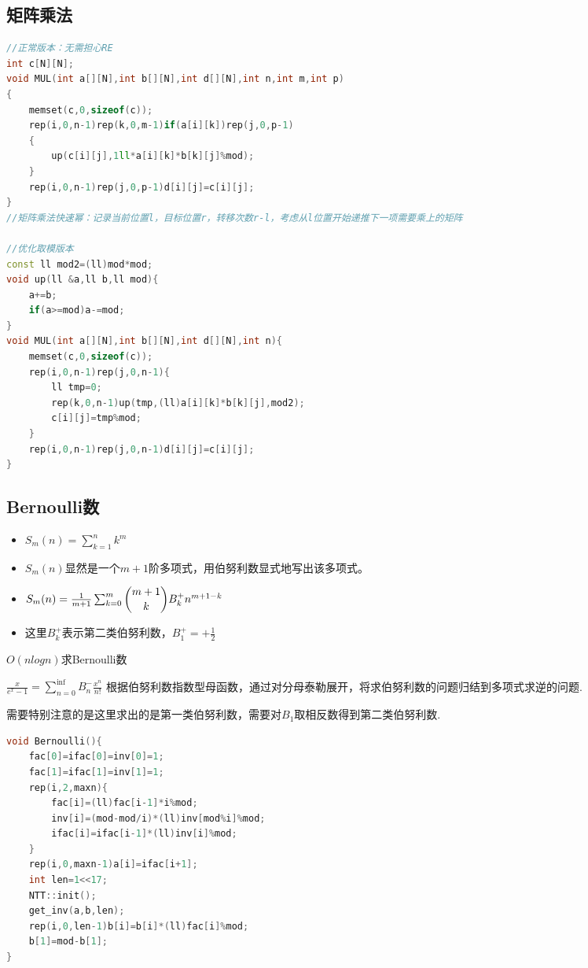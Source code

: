 \documentclass[UTF8,a4paper,titlepage]{ctexart}
\begin{document}
\subsection{矩阵乘法}
\begin{lstlisting}[language=C++]
//正常版本：无需担心RE
int c[N][N];
void MUL(int a[][N],int b[][N],int d[][N],int n,int m,int p)
{
	memset(c,0,sizeof(c));
	rep(i,0,n-1)rep(k,0,m-1)if(a[i][k])rep(j,0,p-1)
	{	
		up(c[i][j],1ll*a[i][k]*b[k][j]%mod);
	}
	rep(i,0,n-1)rep(j,0,p-1)d[i][j]=c[i][j];
}
//矩阵乘法快速幂：记录当前位置l，目标位置r，转移次数r-l，考虑从l位置开始递推下一项需要乘上的矩阵

//优化取模版本
const ll mod2=(ll)mod*mod;
void up(ll &a,ll b,ll mod){
	a+=b;
	if(a>=mod)a-=mod;
}
void MUL(int a[][N],int b[][N],int d[][N],int n){
	memset(c,0,sizeof(c));
	rep(i,0,n-1)rep(j,0,n-1){
		ll tmp=0;
		rep(k,0,n-1)up(tmp,(ll)a[i][k]*b[k][j],mod2);
		c[i][j]=tmp%mod;
	}
	rep(i,0,n-1)rep(j,0,n-1)d[i][j]=c[i][j];
}
\end{lstlisting}

\subsection{Bernoulli数}
\begin{itemize}
	\item $S_m(n)=\sum_{k=1}^{n}k^m$
	\item $S_m(n)$显然是一个$m+1$阶多项式，用伯努利数显式地写出该多项式。
	\item $S_m(n)= \frac{1}{m+1} \sum_{k=0}^{m} \dbinom{m+1}{k}B_{k}^{+}n^{m+1-k}$
	\item 这里$B_{k}^{+}$表示第二类伯努利数，$B_1^+=+\frac{1}{2}$
\end{itemize}

$O(nlogn)$求Bernoulli数

$\frac{x}{e^x-1}=\sum_{n=0}^{\inf}B_n^-\frac{x^n}{n!}$
根据伯努利数指数型母函数，通过对分母泰勒展开，将求伯努利数的问题归结到多项式求逆的问题.

需要特别注意的是这里求出的是第一类伯努利数，需要对$B_1$取相反数得到第二类伯努利数.

\begin{lstlisting}[language=C++] 
void Bernoulli(){
    fac[0]=ifac[0]=inv[0]=1;
    fac[1]=ifac[1]=inv[1]=1;
    rep(i,2,maxn){
        fac[i]=(ll)fac[i-1]*i%mod;
        inv[i]=(mod-mod/i)*(ll)inv[mod%i]%mod;
        ifac[i]=ifac[i-1]*(ll)inv[i]%mod;
    }
    rep(i,0,maxn-1)a[i]=ifac[i+1];
    int len=1<<17;
    NTT::init();
    get_inv(a,b,len);
    rep(i,0,len-1)b[i]=b[i]*(ll)fac[i]%mod;
    b[1]=mod-b[1];
}
\end{lstlisting}
\end{document}
